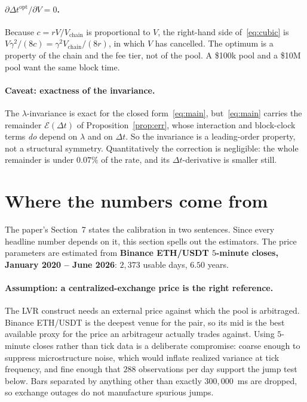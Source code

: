\documentclass[11pt]{article}
\theoremstyle{definition}
\theoremstyle{remark}
\newcommand{\dt}{\Delta t}
\newcommand{\1}{\mathbf{1}}
\begin{document}
\paragraph{$\partial\dt^{\mathrm{opt}}/\partial V = 0$.} Because $c = rV/V_{\mathrm{chain}}$ is proportional to $V$, the right-hand side of~\eqref{eq:cubic} is $V\gamma^2/(8c) = \gamma^2 V_{\mathrm{chain}}/(8r)$, in which $V$ has cancelled. The optimum is a property of the chain and the fee tier, not of the pool. A \$100k pool and a \$10M pool want the same block time.

\paragraph{Caveat: exactness of the invariance.} The $\lambda$-invariance is exact for the closed form~\eqref{eq:main}, but~\eqref{eq:main} carries the remainder $\mathcal E(\dt)$ of Proposition~\ref{prop:err}, whose interaction and block-clock terms \emph{do} depend on $\lambda$ and on $\dt$. So the invariance is a leading-order property, not a structural symmetry. Quantitatively the correction is negligible: the whole remainder is under $0.07\%$ of the rate, and its $\dt$-derivative is smaller still.
\section{Where the numbers come from}\label{sec:calibration}

The paper's Section~7 states the calibration in two sentences. Since every headline number depends on it, this section spells out the estimators. The price parameters are estimated from \textbf{Binance ETH/USDT $5$-minute closes, January 2020 -- June 2026}: $2{,}373$ usable days, $6.50$ years.

\paragraph{Assumption: a centralized-exchange price is the right reference.} The LVR construct needs an external price against which the pool is arbitraged. Binance ETH/USDT is the deepest venue for the pair, so its mid is the best available proxy for the price an arbitrageur actually trades against. Using $5$-minute closes rather than tick data is a deliberate compromise: coarse enough to suppress microstructure noise, which would inflate realized variance at tick frequency, and fine enough that $288$ observations per day support the jump test below. Bars separated by anything other than exactly $300{,}000$~ms are dropped, so exchange outages do not manufacture spurious jumps.
\end{document}

